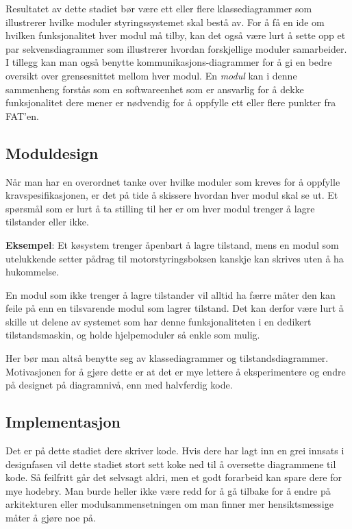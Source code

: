 Resultatet av dette stadiet bør være ett eller flere klassediagrammer som illustrerer hvilke moduler styringssystemet skal bestå av. For å få en ide om hvilken funksjonalitet hver modul må tilby, kan det også være lurt å sette opp et par sekvensdiagrammer som illustrerer hvordan forskjellige moduler samarbeider. I tillegg kan man også benytte kommunikasjons-diagrammer for å gi en bedre oversikt over grensesnittet mellom hver modul. En \textit{modul} kan i denne sammenheng forstås som en softwareenhet som er ansvarlig for å dekke funksjonalitet dere mener er nødvendig for å oppfylle ett eller flere punkter fra FAT'en.

\subsection{Moduldesign}
Når man har en overordnet tanke over hvilke moduler som kreves for å oppfylle kravspesifikasjonen, er det på tide å skissere hvordan hver modul skal se ut. Et spørsmål som er lurt å ta stilling til her er om hver modul trenger å lagre tilstander eller ikke.

\textbf{Eksempel}: Et køsystem trenger åpenbart å lagre tilstand, mens en modul som utelukkende setter pådrag til motorstyringsboksen kanskje kan skrives uten å ha hukommelse.

En modul som ikke trenger å lagre tilstander vil alltid ha færre måter den kan feile på enn en tilsvarende modul som lagrer tilstand. Det kan derfor være lurt å skille ut delene av systemet som har denne funksjonaliteten i en dedikert tilstandsmaskin, og holde hjelpemoduler så enkle som mulig.

Her bør man altså benytte seg av klassediagrammer og tilstandsdiagrammer. Motivasjonen for å gjøre dette er at det er mye lettere å eksperimentere og endre på designet på diagramnivå, enn med halvferdig kode.

\subsection{Implementasjon}


Det er på dette stadiet dere skriver kode. Hvis dere har lagt inn en grei innsats i designfasen vil dette stadiet stort sett koke ned til å oversette diagrammene til kode. Så feilfritt går det selvsagt aldri, men et godt forarbeid kan spare dere for mye hodebry. Man burde heller ikke være redd for å gå tilbake for å endre på arkitekturen eller modulsammensetningen om man finner mer hensiktsmessige måter å gjøre noe på.

